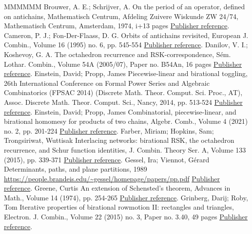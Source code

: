 \begin{thebibliography}{MMMMMM}
 Brouwer, A. E.; Schrijver, A. On the period of an operator, defined on antichains, Mathematisch Centrum, Afdeling Zuivere Wiskunde ZW 24/74, Mathematisch Centrum, Amsterdam, 1974, i+13 pages \href{https://alco.centre-mersenne.org/articles/10.5802/alco.385/#brouwerschrijver}{Publisher reference}.
 Cameron, P. J.; Fon-Der-Flaass, D. G. Orbits of antichains revisited, European J. Combin., Volume 16 (1995) no. 6, pp. 545-554 \href{https://alco.centre-mersenne.org/articles/10.5802/alco.385/#cameronfonderflaass}{Publisher reference}.
 Danilov, V. I.; Koshevoy, G. A. The octahedron recurrence and RSK-correspondence, Sém. Lothar. Combin., Volume 54A (2005/07), Paper no. B54An, 16 pages \href{https://alco.centre-mersenne.org/articles/10.5802/alco.385/#danilovkoshevoy}{Publisher reference}.
 Einstein, David; Propp, James Piecewise-linear and birational toggling, 26th International Conference on Formal Power Series and Algebraic Combinatorics (FPSAC 2014) (Discrete Math. Theor. Comput. Sci. Proc., AT), Assoc. Discrete Math. Theor. Comput. Sci., Nancy, 2014, pp. 513-524 \href{https://alco.centre-mersenne.org/articles/10.5802/alco.385/#einsteinpropp2}{Publisher reference}.
 Einstein, David; Propp, James Combinatorial, piecewise-linear, and birational homomesy for products of two chains, Algebr. Comb., Volume 4 (2021) no. 2, pp. 201-224 \href{https://alco.centre-mersenne.org/articles/10.5802/alco.385/#einsteinpropp1}{Publisher reference}.
 Farber, Miriam; Hopkins, Sam; Trongsiriwat, Wuttisak Interlacing networks: birational RSK, the octahedron recurrence, and Schur function identities, J. Combin. Theory Ser. A, Volume 133 (2015), pp. 339-371 \href{https://alco.centre-mersenne.org/articles/10.5802/alco.385/#farberhopkinstrongsiriwat}{Publisher reference}.
 Gessel, Ira; Viennot, Gérard Determinants, paths, and plane partitions, 1989 \url{https://people.brandeis.edu/~gessel/homepage/papers/pp.pdf} \href{https://alco.centre-mersenne.org/articles/10.5802/alco.385/#gesselviennot}{Publisher reference}.
 Greene, Curtis An extension of Schensted’s theorem, Advances in Math., Volume 14 (1974), pp. 254-265 \href{https://alco.centre-mersenne.org/articles/10.5802/alco.385/#greene}{Publisher reference}.
 Grinberg, Darij; Roby, Tom Iterative properties of birational rowmotion II: rectangles and triangles, Electron. J. Combin., Volume 22 (2015) no. 3, Paper no. 3.40, 49 pages \href{https://alco.centre-mersenne.org/articles/10.5802/alco.385/#grinbergroby2}{Publisher reference}.

\end{thebibliography}
